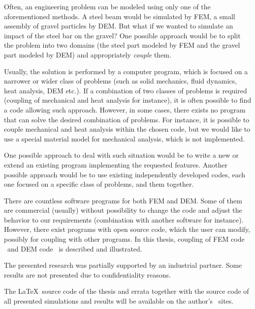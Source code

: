 Often, an engineering problem can be modeled using only one of the aforementioned methods.
A steel beam would be simulated by FEM, a small assembly of gravel particles by DEM.
But what if we wanted to simulate an impact of the steel bar on the gravel?
One possible approach would be to split the problem into two domains (the steel part modeled by FEM and the gravel part modeled by DEM) and appropriately \emph{couple} them.

Usually, the solution is performed by a computer program, which is focused on a narrower or wider class of problems (such as solid mechanics, fluid dynamics, heat analysis, DEM etc.).
If a combination of two classes of problems is required (coupling of mechanical and heat analysis for instance), it is often possible to find a code allowing such approach.
However, in some cases, there exists no program that can solve the desired combination of problems.
For instance, it is possible to couple mechanical and heat analysis within the chosen code, but we would like to use a special material model for mechanical analysis, which is not implemented.

One possible approach to deal with such situation would be to write a new or extend an existing program implementing the requested features.
Another possible approach would be to use existing independently developed codes, each one focused on a specific class of problems, and  them together.

There are countless software programs for both FEM and DEM.
Some of them are commercial (usually) without possibility to change the code and adjust the behavior to our requirements (combination with another software for instance).
However, there exist programs with open source code, which the user can modify, possibly for coupling with other programs.
In this thesis, coupling of FEM code \OOFEM\ and DEM code \YADE\ is described and illustrated.


The presented research was partially supported by an industrial partner.
Some results are not presented due to confidentiality reasons.

The \LaTeX\ source code of the thesis and errata together with the source code of all presented simulations and results will be available on the author's \github\ sites.



